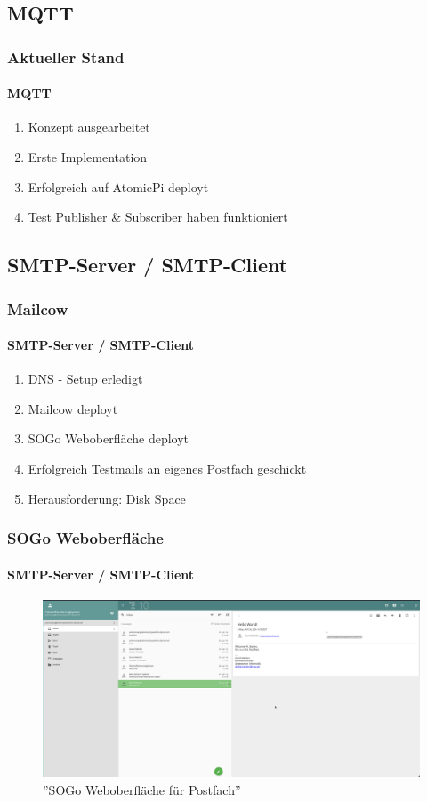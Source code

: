 \documentclass[]{beamer}
\begin{document}
\subsection{MQTT}
\begin{frame}
	\frametitle{Aktueller Stand}
	\framesubtitle{MQTT}
	\begin{enumerate}
		\item Konzept ausgearbeitet
		\item Erste Implementation
		\item Erfolgreich auf AtomicPi deployt
		\item Test Publisher \& Subscriber haben funktioniert
	\end{enumerate}
\end{frame}

\subsection{SMTP-Server / SMTP-Client}
\begin{frame}
	\frametitle{Mailcow}
	\framesubtitle{SMTP-Server / SMTP-Client}
	\begin{enumerate}
		\item DNS - Setup erledigt
		\item Mailcow deployt
		\item SOGo Weboberfläche deployt
		\item Erfolgreich Testmails an eigenes Postfach geschickt
		\item Herausforderung: Disk Space
	\end{enumerate}
\end{frame}

\begin{frame}
	\frametitle{SOGo Weboberfläche}
	\framesubtitle{SMTP-Server / SMTP-Client}
	\begin{figure}
		\begin{minipage}[t]{1\textwidth}
			\centering
			\includegraphics[width=\textwidth]{Images/SGO_Webmail.png}
		\end{minipage}
		\caption{''SOGo Weboberfläche für Postfach''}
	\end{figure}
\end{frame}
\end{document}
